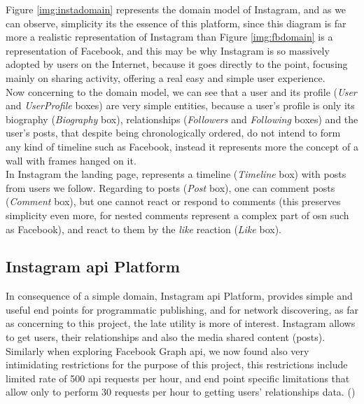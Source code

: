 Figure \ref{img:instadomain} represents the domain model of Instagram, and as we can observe, simplicity its the essence of this platform, since this diagram is far
more a realistic representation of Instagram than Figure \ref{img:fbdomain} is a representation of Facebook, and this may be why Instagram is so massively adopted by users
on the Internet, because it goes directly to the point, focusing mainly on sharing activity, offering a real easy and simple user experience.\\
\indent Now concerning to the domain model, we can see that a user and its profile (\textit{User} and \textit{UserProfile} boxes) are very simple entities, because
a user's profile is only its biography (\textit{Biography} box), relationships (\textit{Followers} and \textit{Following} boxes) and the user's posts, that despite
being chronologically ordered, do not intend to form any kind of timeline such as Facebook, instead it represents more the concept of a wall with frames hanged on it.\\
\indent In Instagram the landing page, represents a timeline (\textit{Timeline} box) with posts from users we follow. Regarding to posts (\textit{Post} box), one can
comment posts (\textit{Comment} box), but one cannot react or respond to comments (this preserves simplicity even more, for nested comments represent
 a complex part of \gls{osn} such as Facebook), and react to them by the \textit{like} reaction (\textit{Like} box).

\subsection*{Instagram \gls{api} Platform}
In consequence of a simple domain, Instagram \gls{api} Platform, provides simple and useful
end points for programmatic publishing, and for network discovering, as far as concerning to this project, the late utility
is more of interest. Instagram allows to get users, their relationships and also the media shared content (posts).\\
\indent Similarly when exploring Facebook Graph \gls{api}, we now found also very intimidating restrictions for the purpose of this project,
this restrictions include limited rate of 500 \gls{api} requests per hour, and end point specific limitations that allow only to
perform 30 requests per hour to getting users' relationships data. (\cite{instadev})

